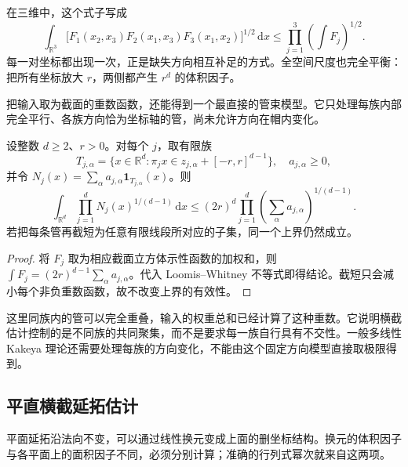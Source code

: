 在三维中，这个式子写成
\[
 \int_{\mathbb R^3}
   \bigl[F_1(x_2,x_3)F_2(x_1,x_3)F_3(x_1,x_2)\bigr]^{1/2}\,\mathrm dx
 \leq\prod_{j=1}^3\left(\int F_j\right)^{1/2}.
\]
每一对坐标都出现一次，正是缺失方向相互补足的方式。全空间尺度也完全平衡：把所有坐标放大 \(r\)，两侧都产生 \(r^d\) 的体积因子。

\ProseParagraphBreak

把输入取为截面的重数函数，还能得到一个最直接的管束模型。它只处理每族内部完全平行、各族方向恰为坐标轴的管，尚未允许方向在帽内变化。

\begin{corollary}[坐标方向平行管的重数估计]\label{b2:cor:25-parallel-tubes}
设整数 \(d\geq2\)、\(r>0\)。对每个 \(j\)，取有限族
\[
 T_{j,\alpha}=\{x\in\mathbb R^d:
                \pi_jx\in z_{j,\alpha}+[-r,r]^{d-1}\},
 \quad a_{j,\alpha}\geq0,
\]
并令 \(N_j(x)=\sum_\alpha a_{j,\alpha}\mathbf1_{T_{j,\alpha}}(x)\)。则
\[
 \int_{\mathbb R^d}\prod_{j=1}^dN_j(x)^{1/(d-1)}\,\mathrm dx
 \leq(2r)^d\prod_{j=1}^d
                      \left(\sum_\alpha a_{j,\alpha}\right)^{1/(d-1)}.
\]
若把每条管再截短为任意有限线段所对应的子集，同一个上界仍然成立。
\end{corollary}
\begin{proof}
将 \(F_j\) 取为相应截面立方体示性函数的加权和，则
\(\int F_j=(2r)^{d-1}\sum_\alpha a_{j,\alpha}\)。代入 Loomis--Whitney 不等式即得结论。截短只会减小每个非负重数函数，故不改变上界的有效性。
\end{proof}

这里同族内的管可以完全重叠，输入的权重总和已经计算了这种重数。它说明横截估计控制的是不同族的共同聚集，而不是要求每一族自行具有不交性。一般多线性 Kakeya 理论还需要处理每族的方向变化，不能由这个固定方向模型直接取极限得到。

\subsection{平直横截延拓估计}
\label{b2:subsec:250203}

平面延拓沿法向不变，可以通过线性换元变成上面的删坐标结构。换元的体积因子与各平面上的面积因子不同，必须分别计算；准确的行列式幂次就来自这两项。

